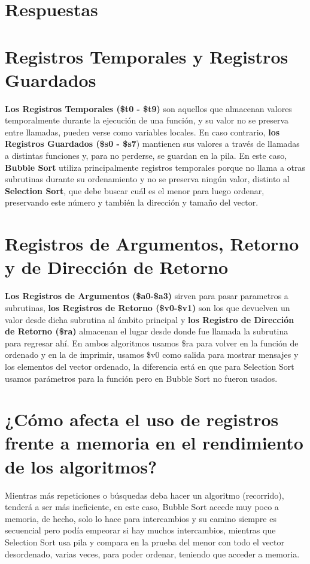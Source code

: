 \documentclass{article}
\begin{document}
\section*{Respuestas}

\section*{Registros Temporales y Registros Guardados}

\textbf{Los Registros Temporales (\$t0 - \$t9)} son aquellos que almacenan valores temporalmente durante la ejecución de una función, y su valor no se preserva entre llamadas, pueden verse como variables locales. En caso contrario, \textbf{los Registros Guardados (\$s0 - \$s7}) mantienen sus valores a través de llamadas a distintas funciones y, para no perderse, se guardan en la pila. En este caso, \textbf{Bubble Sort} utiliza principalmente registros temporales porque no llama a otras subrutinas durante su ordenamiento y no se preserva ningún valor, distinto al \textbf{Selection Sort}, que debe buscar cuál es el menor para luego ordenar, preservando este número y también la dirección y tamaño del vector.

\section*{Registros de Argumentos, Retorno y de Dirección de Retorno}

\textbf{Los Registros de Argumentos (\$a0-\$a3)} sirven para pasar parametros a subrutinas, \textbf{los Registros de Retorno (\$v0-\$v1)} son los que devuelven un valor desde dicha subrutina al ámbito principal y \textbf{los Registro de Dirección de Retorno (\$ra)} almacenan el lugar desde donde fue llamada la subrutina para regresar ahí. En ambos algoritmos usamos \$ra para volver en la función de ordenado y en la de imprimir, usamos \$v0 como salida para mostrar mensajes y los elementos del vector ordenado, la diferencia está en que para Selection Sort usamos parámetros para la función pero en Bubble Sort no fueron usados.

\section*{¿Cómo afecta el uso de registros frente a memoria en el rendimiento de los algoritmos?}

Mientras más repeticiones o búsquedas deba hacer un algoritmo (recorrido), tenderá a ser más ineficiente, en este caso, Bubble Sort accede muy poco a memoria, de hecho, solo lo hace para intercambios y su camino siempre es secuencial pero podía empeorar si hay muchos intercambios, mientras que Selection Sort usa pila y compara en la prueba del menor con todo el vector desordenado, varias veces, para poder ordenar, teniendo que acceder a memoria.
\end{document}
